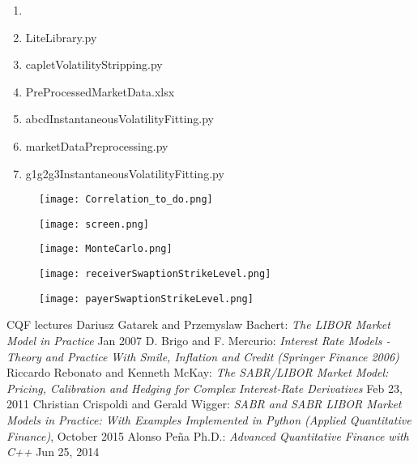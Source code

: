 \documentclass[11pt]{article}
\numberwithin{equation}{subsection}
\begin{document}
\begin{enumerate}
	\item 
	\item LiteLibrary.py
	\item capletVolatilityStripping.py
	\item PreProcessedMarketData.xlsx
	\item abcdInstantaneousVolatilityFitting.py
	\item marketDataPreprocessing.py
	\item g1g2g3InstantaneousVolatilityFitting.py	
\end{enumerate}

\begin{figure}[H]
	\texttt{[image: Correlation\_to\_do.png]}
\end{figure}

\begin{figure}[H]
	\texttt{[image: screen.png]}
\end{figure}

\begin{figure}[H]
	\texttt{[image: MonteCarlo.png]}
\end{figure}

\begin{figure}[H]
	\texttt{[image: receiverSwaptionStrikeLevel.png]}
\end{figure}

\begin{figure}[H]
	\texttt{[image: payerSwaptionStrikeLevel.png]}
\end{figure}



{\small
\begin{thebibliography}{99}
	  CQF lectures 
	  Dariusz Gatarek and Przemyslaw Bachert: 
	\emph{The LIBOR Market Model in Practice} Jan 2007
	 D. Brigo and F. Mercurio: 
	\emph{Interest Rate Models - Theory and Practice With Smile, Inflation and Credit (Springer Finance 2006)}
	 Riccardo Rebonato and Kenneth McKay: 
	\emph{The SABR/LIBOR Market Model: Pricing, Calibration and Hedging for Complex Interest-Rate Derivatives} Feb 23, 2011	 Christian Crispoldi and Gerald Wigger:
	\emph{SABR and SABR LIBOR Market Models in Practice: With Examples Implemented in Python (Applied Quantitative Finance)}, October 2015
	 Alonso Peña Ph.D.:
	\emph{Advanced Quantitative Finance with C++} Jun 25, 2014		 
\end{thebibliography}
}
\end{document}

